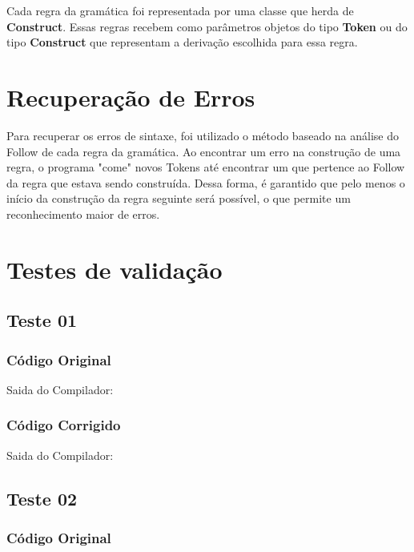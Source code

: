 Cada regra da gramática foi representada por uma classe que herda de \textbf{Construct}.
Essas regras recebem como parâmetros objetos do tipo \textbf{Token} ou do tipo \textbf{Construct} que representam a derivação escolhida para essa regra. 

\section{Recuperação de Erros}
Para recuperar os erros de sintaxe, foi utilizado o método baseado na análise do Follow de cada regra da gramática.
Ao encontrar um erro na construção de uma regra, o programa "come"  novos Tokens até encontrar um que pertence ao Follow da regra que estava sendo construída.
Dessa forma, é garantido que pelo menos o início da construção da regra seguinte será possível, o que permite um reconhecimento maior de erros.


\section{Testes de validação}
\label{sec:sintaticoTestes}

\subsection{Teste 01}
\label{subsec:sintaticoTeste01}

\subsubsection{Código Original}


Saida do Compilador:



\subsubsection{Código Corrigido}


Saida do Compilador:



\subsection{Teste 02}
\label{subsec:sintaticoTeste02}

\subsubsection{Código Original}


